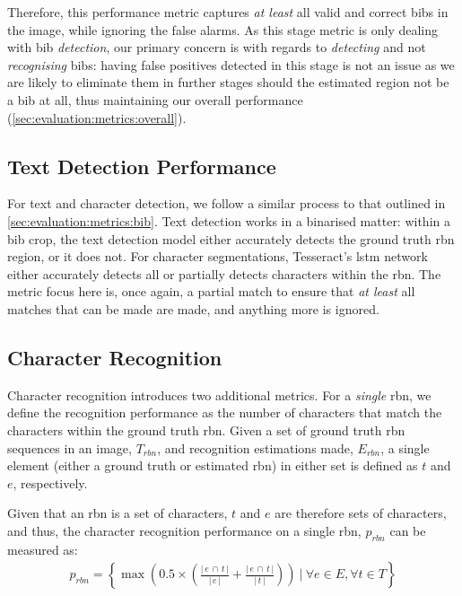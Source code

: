 \noindent
Therefore, this performance metric captures \textit{at least} all valid and correct bibs in the image, while ignoring the false alarms. As this stage metric is only dealing with bib \textit{detection}, our primary concern is with regards to \textit{detecting} and not \textit{recognising} bibs: having false positives detected in this stage is not an issue as we are likely to eliminate them in further stages should the estimated region not be a bib at all, thus maintaining our overall performance (\cref{sec:evaluation:metrics:overall}).

\subsection{Text Detection Performance}

For text and character detection, we follow a similar process to that outlined in \cref{sec:evaluation:metrics:bib}. Text detection works in a binarised matter: within a bib crop, the text detection model either accurately detects the ground truth \gls{rbn} region, or it does not. For character segmentations, Tesseract's \gls{lstm} network either accurately detects all or partially detects characters within the \gls{rbn}. The metric focus here is, once again, a partial match to ensure that \textit{at least} all matches that can be made are made, and anything more is ignored.

\subsection{Character Recognition}

Character recognition introduces two additional metrics. For a \textit{single} \gls{rbn}, we define the recognition performance as the number of characters that match the characters within the ground truth \gls{rbn}. Given a set of ground truth \gls{rbn} sequences in an image, $T_{rbn}$, and recognition estimations made, $E_{rbn}$, a single element (either a ground truth or estimated \gls{rbn}) in either set is defined as $t$ and $e$, respectively.

Given that an \gls{rbn} is a set of characters, $t$ and $e$ are therefore sets of characters, and thus, the character recognition performance on a single \gls{rbn}, $p_{rbn}$ can be measured as:
\begin{align*}
  p_{rbn} = \left\{ \max \left(0.5 \times \left(\frac{\lvert\,e\,\cap\,t\,\rvert}{\lvert\,e\,\rvert} + \frac{\lvert\,e\,\cap\,t\,\rvert}{\lvert\,t\,\rvert} \right) \right)\ |\ \forall e \in E, \forall t \in T \right\}
\end{align*}

